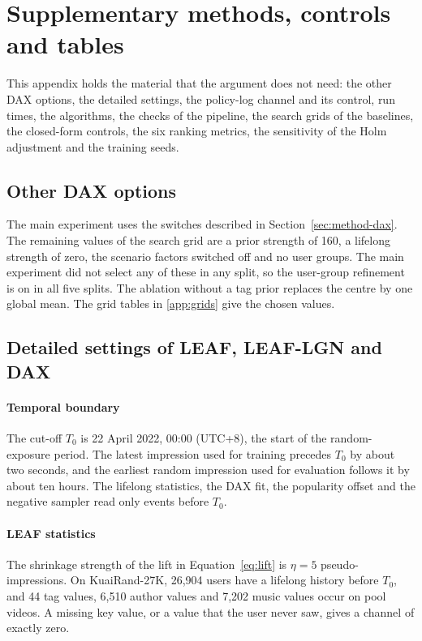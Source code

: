 \section{Supplementary methods, controls and tables}
\label{app:supp}

This appendix holds the material that the argument does not need: the other DAX options, the detailed settings, the policy-log channel and its
control, run times, the algorithms, the checks of the pipeline, the search grids of the baselines, the closed-form controls, the six ranking metrics, the sensitivity of the
Holm adjustment and the training seeds.

\subsection{Other DAX options}\label{app:fh}

The main experiment uses the switches described in Section~\ref{sec:method-dax}. The remaining values of the search grid are a prior strength of 160, a
lifelong strength of zero, the scenario factors switched off and no user groups. The main experiment did not select any of these in any split, so the user-group refinement is on in all five splits. The
ablation without a tag prior replaces the centre by one global mean. The grid tables in \ref{app:grids} give the chosen values.

\subsection{Detailed settings of LEAF, LEAF-LGN and DAX}\label{app:impl}

\paragraph{Temporal boundary} The cut-off $T_0$ is 22 April 2022, 00:00 (UTC+8), the start of the random-exposure period. The latest impression used for
training precedes $T_0$ by about two seconds, and the earliest random impression used for evaluation follows it by about ten hours. The lifelong
statistics, the DAX fit, the popularity offset and the negative sampler read only events before $T_0$.

\paragraph{LEAF statistics} The shrinkage strength of the lift in Equation~\eqref{eq:lift} is $\eta=5$ pseudo-impressions. On KuaiRand-27K, 26,904 users
have a lifelong history before $T_0$, and 44 tag values, 6,510 author values and 7,202 music values occur on pool videos. A missing key value, or a value
that the user never saw, gives a channel of exactly zero.

